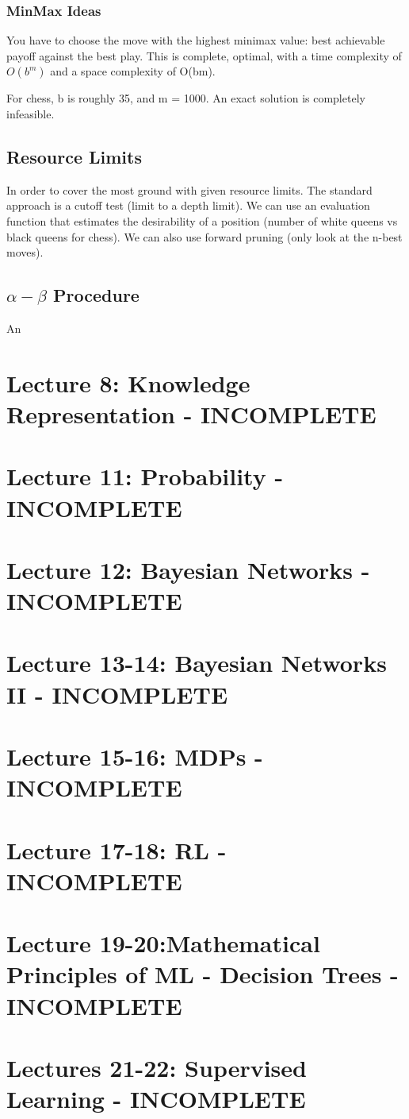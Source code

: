 \documentclass[11pt, oneside]{article}   	%
\begin{document}
\subsubsection{MinMax Ideas}

You have to choose the move with the highest minimax value: best achievable payoff against the best play. This is complete, optimal, with a time complexity of $O(b^m)$ and a space complexity of O(bm).

For chess, b is roughly 35, and m = 1000. An exact solution is completely infeasible.

\subsection{Resource Limits}

In order to cover the most ground with given resource limits. The standard approach is a cutoff test (limit to a depth limit). We can use an evaluation function that estimates the desirability of a position (number of white queens vs black queens for chess). We can also use forward pruning (only look at the n-best moves).

\subsection{$\alpha - \beta$ Procedure}

An 

\section{Lecture 8: Knowledge Representation - INCOMPLETE}
\section{Lecture 11: Probability - INCOMPLETE}
\section{Lecture 12: Bayesian Networks - INCOMPLETE}
\section{Lecture 13-14: Bayesian Networks II - INCOMPLETE}
\section{Lecture 15-16: MDPs - INCOMPLETE}
\section{Lecture 17-18: RL - INCOMPLETE}
\section{Lecture 19-20:Mathematical Principles of ML - Decision Trees - INCOMPLETE}
\section{Lectures 21-22: Supervised Learning - INCOMPLETE}
\end{document}
